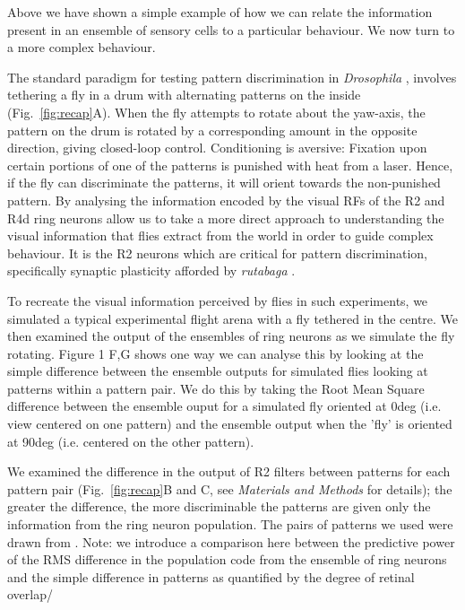 Above we have shown a simple example of how we can relate the information present in an ensemble of sensory cells to a particular behaviour. We now turn to a more complex behaviour.

The standard paradigm for testing pattern discrimination in \emph{Drosophila} \cite{Pan2009,Liu2006,Ernst1999,Dill1993}, involves tethering a fly in a drum with alternating patterns on the inside (Fig.~\ref{fig:recap}A).
When the fly attempts to rotate about the yaw-axis, the pattern on the drum is rotated by a corresponding amount in the opposite direction, giving closed-loop control.
Conditioning is aversive: Fixation upon certain portions of one of the patterns is punished with heat from a laser.
Hence, if the fly can discriminate the patterns, it will orient towards the non-punished pattern. By analysing the information encoded by the visual RFs of the R2 and R4d ring neurons allow us to take a more direct approach to understanding the visual information that flies extract from the world in order to guide complex behaviour. It is the R2 neurons which are critical for pattern discrimination, specifically synaptic plasticity afforded by \emph{rutabaga} \cite{Pan2009,Wang2008,Liu2006,Ernst1999}.

To recreate the visual information perceived by flies in such experiments, we simulated a typical experimental flight arena with a fly tethered in the centre. We then examined the output of the ensembles of ring neurons as we simulate the fly rotating. Figure 1 F,G shows one way we can analyse this by looking at the simple difference between the ensemble outputs for simulated flies looking at patterns within a pattern pair. We do this by taking the Root Mean Square difference between the ensemble ouput for a simulated fly oriented at 0deg (i.e. view centered on one pattern) and the ensemble output when the 'fly' is oriented at 90deg (i.e. centered on the other pattern).

We examined the difference in the output of R2 filters between patterns for each pattern pair (Fig.~\ref{fig:recap}B and C, see \emph{Materials and Methods} for details); the greater the difference, the more discriminable the patterns are given only the information from the ring neuron population. The pairs of patterns we used were drawn from \cite{Ernst1999}. Note: we introduce a comparison here between the predictive power of the RMS difference in the population code from the ensemble of ring neurons and the simple difference in patterns as quantified by the degree of retinal overlap/

